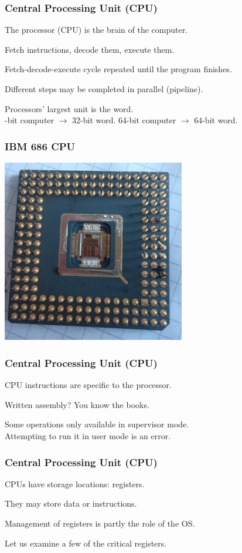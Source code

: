 \begin{frame}
\frametitle{Central Processing Unit (CPU)}

The processor (CPU) is the brain of the computer.

Fetch instructions, decode them, execute them.

Fetch-decode-execute cycle repeated until the program finishes.

Different steps may be completed in parallel (\alert{pipeline}).

Processors' largest unit is the \alert{word}.\\
-bit computer $\rightarrow$ 32-bit word. 64-bit computer $\rightarrow$ 64-bit word.

\end{frame}


\begin{frame}
\frametitle{IBM 686 CPU}

\begin{center}
\includegraphics[width=0.6\textwidth]{images/686-cpu.jpg}
\end{center}

\end{frame}


\begin{frame}
\frametitle{Central Processing Unit (CPU)}
CPU instructions are specific to the processor.

Written assembly? You know the books.

Some operations only available in supervisor mode.\\
\quad Attempting to run it in user mode is an error.


\end{frame}

\begin{frame}
\frametitle{Central Processing Unit (CPU)}
CPUs have storage locations: \alert{registers}.

They may store data or instructions.

Management of registers is partly the role of the OS.

Let us examine a few of the critical registers.

\end{frame}

